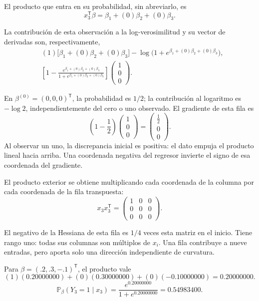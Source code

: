 \documentclass[11pt,a4paper]{article}
\newcommand{\Prob}{\mathbb P}
\newcommand{\T}{^{\mathsf T}}
\begin{document}
El producto que entra en su probabilidad, sin abreviarlo, es
\[
x_{3}\T\beta=\beta_1+(0)\beta_2+(0)\beta_3.
\]

La contribución de esta observación a la log-verosimilitud
y su vector de derivadas son, respectivamente,
\[
\begin{aligned}
&(1)\bigl[\beta_1+(0)\beta_2+(0)\beta_3\bigr]-\log\bigl(1+e^{\beta_1+(0)\beta_2+(0)\beta_3}\bigr),\\&\left[1-\frac{e^{\beta_1+(0)\beta_2+(0)\beta_3}}{1+e^{\beta_1+(0)\beta_2+(0)\beta_3}}\right]\begin{pmatrix}1\\0\\0\end{pmatrix}.\end{aligned}
\]

En \(\beta^{(0)}=(0,0,0)\T\), la probabilidad es \(1/2\);
la contribución al logaritmo es \(-\log2\), independientemente
del cero o uno observado. El gradiente de esta fila es
\[
\left(1-\frac12\right)\begin{pmatrix}1\\0\\0\end{pmatrix}=\begin{pmatrix}\frac{1}{2}\\0\\0\end{pmatrix}.
\]
Al observar un uno, la discrepancia inicial es positiva: el dato empuja el producto lineal hacia arriba. Una coordenada negativa del regresor invierte el signo de esa coordenada del gradiente.

El producto exterior se obtiene multiplicando cada coordenada
de la columna por cada coordenada de la fila transpuesta:
\[
x_{3}x_{3}\T=\begin{pmatrix}1&0&0\\0&0&0\\0&0&0\end{pmatrix}.
\]

El negativo de la Hessiana de esta fila es \(1/4\)
veces esta matriz en el inicio. Tiene rango uno:
todas sus columnas son múltiplos de \(x_i\).
Una fila contribuye a nueve entradas, pero aporta
solo una dirección independiente de curvatura.

Para \(\beta=(.2,.3,-.1)\T\), el producto vale
\[
(1)(0.20000000)+(0)(0.30000000)+(0)(-0.10000000)=0.20000000.
\]
\[
\Prob_\beta(Y_{3}=1\mid x_{3})=\frac{e^{0.20000000}}{1+e^{0.20000000}}=0.54983400.
\]
\end{document}
